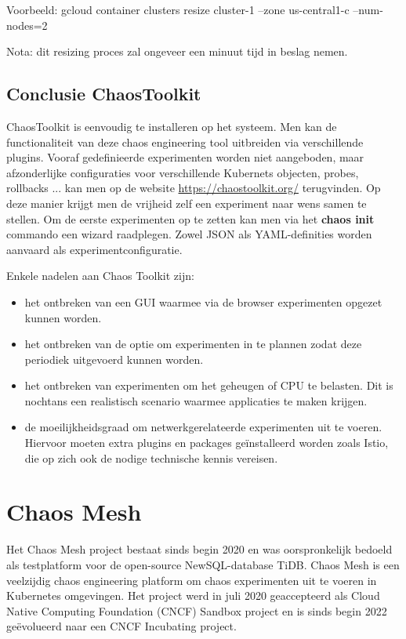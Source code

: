 Voorbeeld: gcloud container clusters resize cluster-1 --zone us-central1-c --num-nodes=2

Nota: dit resizing proces zal ongeveer een minuut tijd in beslag nemen. 

\subsection{Conclusie ChaosToolkit}

ChaosToolkit is eenvoudig te installeren op het systeem. Men kan de functionaliteit van deze chaos engineering tool uitbreiden via verschillende plugins. Vooraf gedefinieerde experimenten worden niet aangeboden, maar afzonderlijke configuraties voor verschillende Kubernets objecten, probes, rollbacks ... kan men op de website \url{https://chaostoolkit.org/} terugvinden.
\newline Op deze manier krijgt men de vrijheid zelf een experiment naar wens samen te stellen. Om de eerste experimenten op te zetten kan men via het {\bf chaos init} commando een wizard raadplegen. Zowel JSON als YAML-definities worden aanvaard als experimentconfiguratie. 

Enkele nadelen aan Chaos Toolkit zijn:
\begin{itemize}
    \item  het ontbreken van een GUI waarmee via de browser experimenten opgezet kunnen worden.
    \item  het ontbreken van de optie om experimenten in te plannen zodat deze periodiek uitgevoerd kunnen worden. 
    \item het ontbreken van experimenten om het geheugen of CPU te belasten. Dit is nochtans een realistisch scenario waarmee applicaties te maken krijgen.  
    \item  de moeilijkheidsgraad om netwerkgerelateerde experimenten uit te voeren. Hiervoor moeten extra plugins en packages geïnstalleerd worden zoals Istio, die op zich ook de nodige technische kennis vereisen.   
\end{itemize}

\section{Chaos Mesh}

Het Chaos Mesh project bestaat sinds begin 2020 en was oorspronkelijk bedoeld als testplatform voor de open-source NewSQL-database TiDB. Chaos Mesh is een veelzijdig chaos engineering platform om chaos experimenten uit te voeren in Kubernetes omgevingen. Het project werd in juli 2020 geaccepteerd als Cloud Native Computing Foundation (CNCF) Sandbox project en is sinds begin 2022 geëvolueerd naar een CNCF Incubating project. \autocite{CNCF2022b}

